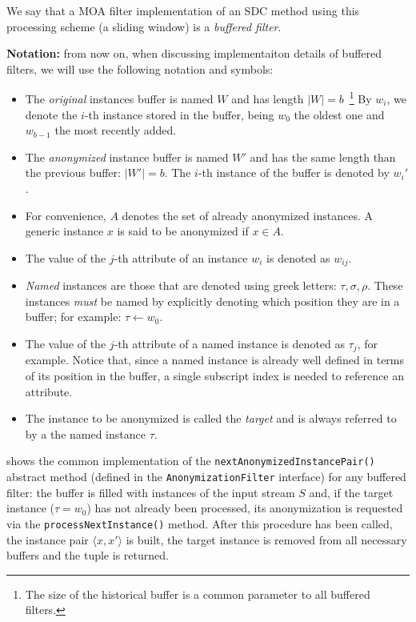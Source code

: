 We say that a MOA filter implementation of an SDC method using this processing scheme (a sliding window) is a \textit{buffered filter}.

\textbf{Notation:} from now on, when discussing implementaiton details of buffered filters, we will use the following notation and symbols:

\begin{itemize}
\item
	The \textit{original} instances buffer is named $W$ and has length $\vert W \vert = b$~\footnote{The size of the historical buffer is a common parameter to all buffered filters.} By $w_i$, we denote the $i$-th instance stored in the buffer, being $w_0$ the oldest one and $w_{b-1}$ the most recently added.
\item
	The \textit{anonymized} instance buffer is named $W'$ and has the same length than the previous buffer: $\vert W' \vert = b$. The $i$-th instance of the buffer is denoted by $w_i'$.
\item
	For convenience, $A$ denotes the set of already anonymized instances. A generic instance $x$ is said to be anonymized if $x \in A$.
\item
	The value of the $j$-th attribute of an instance $w_i$ is denoted as $w_{ij}$.
\item
	\textit{Named} instances are those that are denoted using greek letters: $\tau, \sigma, \rho$. These instances \textit{must} be named by explicitly denoting which position they are in a buffer; for example: $\tau \leftarrow w_0$.
\item
	The value of the $j$-th attribute of a named instance is denoted as $\tau_j$, for example. Notice that, since a named instance is already well defined in terms of its position in the buffer, a single subscript index is needed to reference an attribute.
\item
	The instance to be anonymized is called the \textit{target} and is always referred to by a the named instance $\tau$.
\end{itemize}

 shows the common implementation of the \texttt{nextAnonymizedInstancePair()} abstract method (defined in the \texttt{AnonymizationFilter} interface) for any buffered filter: the buffer is filled with instances of the input stream $S$ and, if the target instance ($\tau = w_0$) has not already been processed, its anonymization is requested via the \texttt{processNextInstance()} method. After this procedure has been called, the instance pair $\langle x, x' \rangle$ is built, the target instance is removed from all necessary buffers and the tuple is returned.

